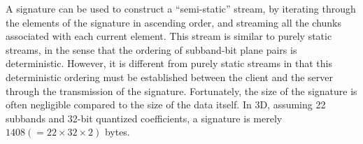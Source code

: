 A signature can be used to construct a ``semi-static'' stream, by iterating through the elements of
the signature in ascending order, and streaming all the chunks associated with each current element.
This stream is similar to purely static streams, in the sense that the ordering of subband-bit plane
pairs is deterministic. However, it is different from purely static streams in that this
deterministic ordering must be established between the client and the server through the
transmission of the signature. Fortunately, the size of the signature is often negligible compared
to the size of the data itself. In 3D, assuming 22 subbands and 32-bit quantized coefficients, a
signature is merely $1408 (=22\times 32\times 2)$ bytes.
